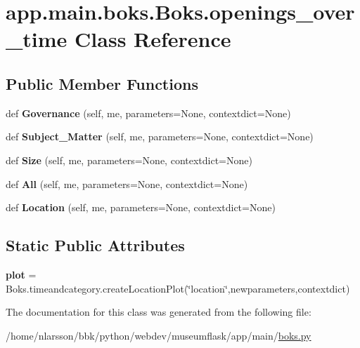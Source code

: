 \hypertarget{classapp_1_1main_1_1boks_1_1Boks_1_1openings__over__time}{}\section{app.\+main.\+boks.\+Boks.\+openings\+\_\+over\+\_\+time Class Reference}
\label{classapp_1_1main_1_1boks_1_1Boks_1_1openings__over__time}
\subsection*{Public Member Functions}
\begin{DoxyCompactItemize}
\item 
\mbox{\label{classapp_1_1main_1_1boks_1_1Boks_1_1openings__over__time_afab2bb1f24ab57bd8fe90bd88e8d551b}} 
def {\bfseries Governance} (self, me, parameters=None, contextdict=None)
\item 
\mbox{\label{classapp_1_1main_1_1boks_1_1Boks_1_1openings__over__time_a85eb935d7c696866ac8a7ea6368d87ca}} 
def {\bfseries Subject\+\_\+\+Matter} (self, me, parameters=None, contextdict=None)
\item 
\mbox{\label{classapp_1_1main_1_1boks_1_1Boks_1_1openings__over__time_a655b46b93e06c52dbb3ac206c755300b}} 
def {\bfseries Size} (self, me, parameters=None, contextdict=None)
\item 
\mbox{\label{classapp_1_1main_1_1boks_1_1Boks_1_1openings__over__time_a5a1afa6f24bc04136021520a1069583a}} 
def {\bfseries All} (self, me, parameters=None, contextdict=None)
\item 
\mbox{\label{classapp_1_1main_1_1boks_1_1Boks_1_1openings__over__time_a7644252eeb95f3d91c64eee3832cfd80}} 
def {\bfseries Location} (self, me, parameters=None, contextdict=None)
\end{DoxyCompactItemize}
\subsection*{Static Public Attributes}
\begin{DoxyCompactItemize}
\item 
\mbox{\label{classapp_1_1main_1_1boks_1_1Boks_1_1openings__over__time_a371863b2286b65926e866992ee88f14d}} 
{\bfseries plot} = Boks.\+timeandcategory.\+create\+Location\+Plot(\char`\"{}location\char`\"{},newparameters,contextdict)
\end{DoxyCompactItemize}


The documentation for this class was generated from the following file\+:\begin{DoxyCompactItemize}
\item 
/home/nlarsson/bbk/python/webdev/museumflask/app/main/\mbox{\hyperlink{boks_8py}{boks.\+py}}\end{DoxyCompactItemize}
